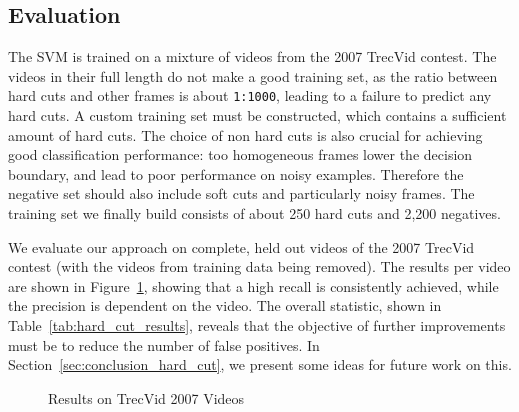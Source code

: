 \FloatBarrier
\subsection{Evaluation}
\label{sec:hard_cut_evaluation}

The SVM is trained on a mixture of videos from the 2007 TrecVid contest.
The videos in their full length do not make a good training set, as the ratio between hard cuts and other frames is about \texttt{1:1000}, leading to a failure to predict any hard cuts.
A custom training set must be constructed, which contains a sufficient amount of hard cuts.
The choice of non hard cuts is also crucial for achieving good classification performance: too homogeneous frames lower the decision boundary, and lead to poor performance on noisy examples.
Therefore the negative set should also include soft cuts and particularly noisy frames.
The training set we finally build consists of about 250 hard cuts and 2,200 negatives.

We evaluate our approach on complete, held out videos of the 2007 TrecVid contest (with the videos from training data being removed). 
The results per video are shown in Figure~\ref{fig:scatterplothceval}, showing that a high recall is consistently achieved, while the precision is dependent on the video. 
The overall statistic, shown in Table~\ref{tab:hard_cut_results}, reveals that the objective of further improvements must be to reduce the number of false positives.
In Section~\ref{sec:conclusion_hard_cut}, we present some ideas for future work on this.

\begin{figure}[ht]
\centering
{}
\caption{Results on TrecVid 2007 Videos}
\label{fig:scatterplothceval}
\end{figure}

